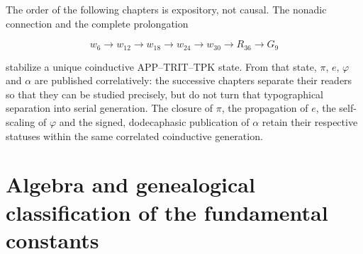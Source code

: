 


The order of the following chapters is expository, not causal. The nonadic
connection and the complete prolongation

\[
w_6\longrightarrow w_{12}\longrightarrow w_{18}\longrightarrow w_{24}
\longrightarrow w_{30}\longrightarrow R_{36}\longrightarrow G_9
\]

stabilize a unique coinductive APP--TRIT--TPK state. From that state,
\(\pi\), \(e\), \(\varphi\) and \(\alpha\) are published correlatively: the
successive chapters separate their readers so that they can be studied precisely,
but do not turn that typographical separation into serial generation. The
closure of \(\pi\), the propagation of \(e\), the self-scaling of \(\varphi\) and
the signed, dodecaphasic publication of \(\alpha\) retain their respective
statuses within the same correlated coinductive generation.


\HMTFlushCurrentChapter
\chapter{Algebra and genealogical classification of the fundamental constants}%
\begingroup
\renewcommand{\chapter}[2][]{}%
%
\endgroup

\begin{HMTScientificOwnerSubordinated}



\end{HMTScientificOwnerSubordinated}

